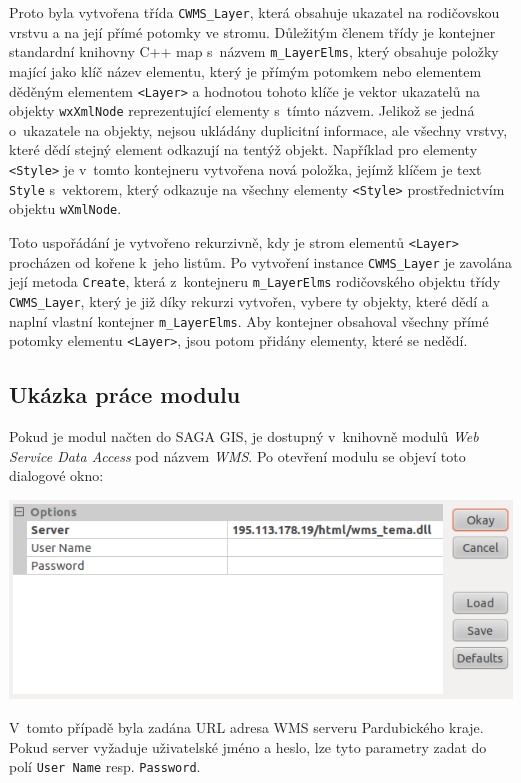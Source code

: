 \documentclass[a4paper,12pt]{article}
\begin{document}
Proto byla vytvořena třída {\tt CWMS\_Layer}, která obsahuje ukazatel na
rodičovskou vrstvu a na její přímé potomky ve stromu. Důležitým členem
třídy je kontejner standardní knihovny C++ map s~názvem {\tt m\_LayerElms}, 
který obsahuje položky mající jako klíč název elementu, 
který je přímým potomkem nebo elementem děděným elementem {\tt <Layer>} a hodnotou tohoto 
klíče je vektor ukazatelů na objekty {\tt wxXmlNode} reprezentující elementy
s~tímto názvem.
Jelikož se jedná o~ukazatele na objekty, nejsou
ukládány duplicitní informace, ale všechny vrstvy, které dědí stejný
element odkazují na tentýž objekt.
 Například pro elementy  {\tt <Style>} je v~tomto kontejneru 
vytvořena nová položka, jejímž klíčem je text  {\tt Style} s~vektorem,
který odkazuje na všechny elementy  {\tt <Style>} prostřednictvím objektu
 {\tt wXmlNode}. 


Toto uspořádání je vytvořeno rekurzivně, kdy je strom elementů {\tt<Layer>}
procházen od kořene k~jeho listům. Po vytvoření instance {\tt CWMS\_Layer}
je zavolána její metoda {\tt Create}, která z~kontejneru {\tt m\_LayerElms}
rodičovského objektu třídy {\tt CWMS\_Layer}, který je již díky rekurzi
vytvořen, vybere ty objekty, které dědí a naplní vlastní kontejner
{\tt m\_LayerElms}. Aby kontejner obsahoval všechny přímé potomky elementu
{\tt <Layer>}, jsou potom přidány elementy, které se nedědí.

\newpage
\subsection{Ukázka práce modulu}

Pokud je modul načten do SAGA GIS, je dostupný v~knihovně modulů \emph{Web
Service Data Access} pod názvem \emph{WMS}. Po otevření modulu se objeví toto
dialogové okno:

 \includegraphics[scale=0.4]{figures/SAGA_okno1.png}

V~tomto případě byla zadána URL adresa WMS serveru Pardubického
kraje.  Pokud server vyžaduje uživatelské jméno a heslo, lze tyto
parametry zadat do polí {\tt User Name} resp. {\tt Password}.
\end{document}
